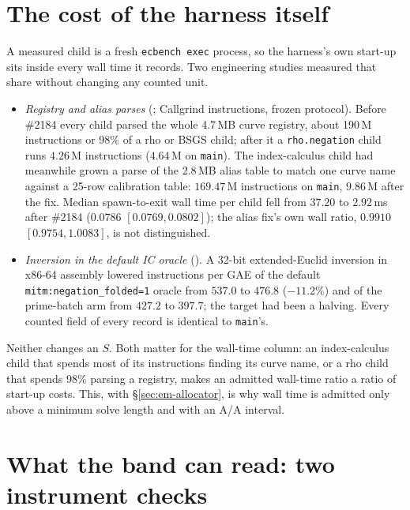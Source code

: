 \section{The cost of the harness itself}\label{sec:em-overhead}

A measured child is a fresh \texttt{ecbench exec} process, so the harness's
own start-up sits inside every wall time it records. Two engineering
studies measured that share without changing any counted unit.
\begin{itemize}
\item \emph{Registry and alias parses}
  (; Callgrind
  instructions, frozen protocol). Before \#2184 every child parsed the whole
  4.7\,MB curve registry, about 190\,M instructions or 98\% of a rho or BSGS
  child; after it a \texttt{rho.negation} child runs $4.26$\,M instructions
  ($4.64$\,M on \texttt{main}).
  The index-calculus child had meanwhile grown a parse of the 2.8\,MB alias
  table to match one curve name against a 25-row calibration table: $169.47$\,M
  instructions on \texttt{main}, $9.86$\,M after the fix. Median spawn-to-exit
  wall time per child fell from $37.20$ to $2.92$\,ms after \#2184
  ($0.0786$ $[0.0769,0.0802]$); the alias fix's own wall ratio, $0.9910$
  $[0.9754,1.0083]$, is not distinguished.
\item \emph{Inversion in the default IC oracle}
  (). A 32-bit
  extended-Euclid inversion in x86-64 assembly lowered instructions per GAE
  of the default \texttt{mitm:negation\_folded=1} oracle from $537.0$ to
  $476.8$ ($-11.2\%$) and of the prime-batch arm from $427.2$ to $397.7$; the
  target had been a halving. Every counted field of every record is
  identical to \texttt{main}'s.
\end{itemize}
Neither changes an $S$. Both matter for the wall-time column: an
index-calculus child that spends most of its instructions finding its curve
name, or a rho child that spends 98\% parsing a registry, makes an
admitted wall-time ratio a ratio of start-up costs. This, with
\S\ref{sec:em-allocator}, is why wall time is admitted only above a minimum
solve length and with an A/A interval.

\section{What the band can read: two instrument checks}\label{sec:em-yardstick}

